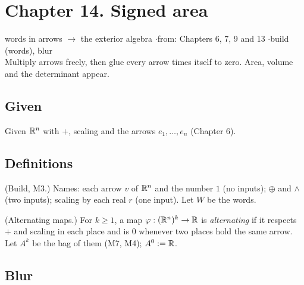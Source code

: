 \section*{Chapter 14. Signed area}
\begin{center}
{\normalsize words in arrows $\to$ the exterior algebra \quad$\cdot$\quad from: Chapters 6, 7, 9 and 13 \quad$\cdot$\quad build (words), blur}\\[4pt]
{\small Multiply arrows freely, then glue every arrow times itself to zero. Area, volume and the determinant appear.}
\end{center}

\subsection*{Given}

Given $\mathbb{R}^n$ with $+$, scaling and the arrows $e_1, \dots, e_n$ (Chapter 6).

\subsection*{Definitions}

\begin{lines}
\item[\lab{D1}] (Build, M3.) Names: each arrow $v$ of $\mathbb{R}^n$ and the number $1$ (no inputs); $\oplus$ and $\wedge$ (two inputs); scaling by each real $r$ (one input). Let $W$ be the words.
\item[\lab{D2}] (Alternating maps.) For $k \ge 1$, a map $\varphi : (\mathbb{R}^n)^k \to \mathbb{R}$ is \emph{alternating} if it respects $+$ and scaling in each place and is $0$ whenever two places hold the same arrow. Let $A^k$ be the bag of them (M7, M4); $A^0 := \mathbb{R}$.
\end{lines}

\subsection*{Blur}

